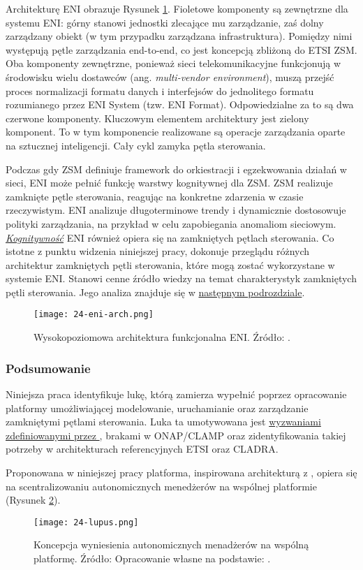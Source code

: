 Architekturę \cite{etsieni2023} ENI obrazuje Rysunek \ref{fig:24-eni-arch}. Fioletowe komponenty są zewnętrzne dla systemu ENI: górny stanowi jednostki zlecające mu zarządzanie, zaś dolny zarządzany obiekt (w tym przypadku zarządzana infrastruktura). Pomiędzy nimi występują pętle zarządzania end-to-end, co jest koncepcją zbliżoną do ETSI ZSM. Oba komponenty zewnętrzne, ponieważ sieci telekomunikacyjne funkcjonują w środowisku wielu dostawców (ang. \textit{multi-vendor environment}), muszą przejść proces normalizacji formatu danych i interfejsów do jednolitego formatu rozumianego przez ENI System (tzw. ENI Format). Odpowiedzialne za to są dwa czerwone komponenty. Kluczowym elementem architektury jest zielony komponent. To w tym komponencie realizowane są operacje zarządzania oparte na sztucznej inteligencji. Cały cykl zamyka pętla sterowania. 

Podczas gdy ZSM definiuje framework do orkiestracji i egzekwowania działań w sieci, ENI może pełnić funkcję warstwy kognitywnej dla ZSM. ZSM realizuje zamknięte pętle sterowania, reagując na konkretne zdarzenia w czasie rzeczywistym. ENI analizuje długoterminowe trendy i dynamicznie dostosowuje polityki zarządzania, na przykład w celu zapobiegania anomaliom sieciowym. \hyperlink{def:kognitywnosc}{\textit{Kognitywność}} ENI również opiera się na zamkniętych pętlach sterowania. Co istotne z punktu widzenia niniejszej pracy, \cite{etsieni2024} dokonuje przeglądu różnych architektur zamkniętych pętli sterowania, które mogą zostać wykorzystane w systemie ENI. Stanowi cenne źródło wiedzy na temat charakterystyk zamkniętych pętli sterowania. Jego analiza znajduje się w \hyperlink{sec:25}{następnym podrozdziale}.



\begin{figure}[!h]
    \centering \texttt{[image: 24-eni-arch.png]}
    \caption{Wysokopoziomowa architektura funkcjonalna ENI. Źródło: \cite{etsieni2023}.}\label{fig:24-eni-arch}
\end{figure}


\subsubsection{Podsumowanie}

Niniejsza praca identyfikuje lukę, którą zamierza wypełnić poprzez opracowanie platformy umożliwiającej modelowanie, uruchamianie oraz zarządzanie zamkniętymi pętlami sterowania. Luka ta umotywowana jest \hyperlink{list:1}{wyzwaniami zdefiniowanymi przez \cite{fallon2019}}, brakami w ONAP/CLAMP oraz zidentyfikowania takiej potrzeby w architekturach referencyjnych ETSI oraz CLADRA.

Proponowana w niniejszej pracy platforma, inspirowana architekturą z \cite{kephart2003}, opiera się na scentralizowaniu autonomicznych menedżerów na wspólnej platformie (Rysunek \ref{fig:24-lupus}).

\begin{figure}[!htbp]
    \centering \texttt{[image: 24-lupus.png]}
    \caption{Koncepcja wyniesienia autonomicznych menadżerów na wspólną platformę. Źródło: Opracowanie własne na podstawie: \cite{kephart2003}.}\label{fig:24-lupus}
\end{figure}